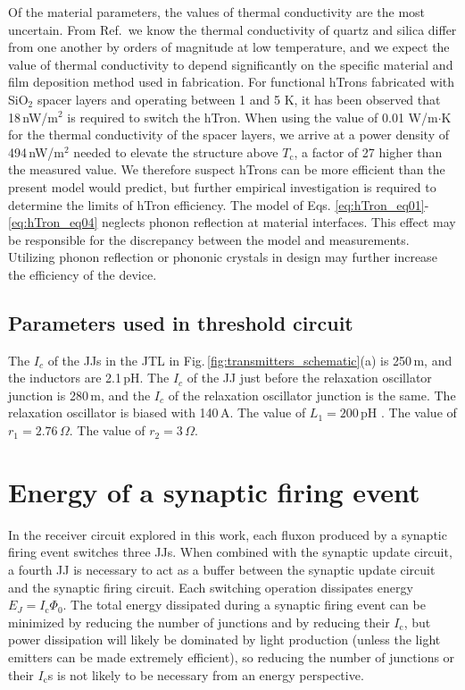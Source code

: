 \documentclass[twocolumn]{article}
\newcommand{\onlinecite}[1]{\hspace{-1 ex} \nocite{#1}\citenum{#1}}
\begin{document}
Of the material parameters, the values of thermal conductivity are the most uncertain. From Ref.\,\onlinecite{zepo1971} we know the thermal conductivity of quartz and silica differ from one another by orders of magnitude at low temperature, and we expect the value of thermal conductivity to depend significantly on the specific material and film deposition method used in fabrication. For functional hTrons fabricated with SiO$_2$ spacer layers and operating between 1 and 5 K, it has been observed \cite{mc2018} that 18\,nW/\textmu m$^2$ is required to switch the hTron. When using the value of 0.01 W/m$\cdot$K for the thermal conductivity of the spacer layers, we arrive at a power density of 494\,nW/\textmu m$^2$ needed to elevate the structure above $T_{\mathrm{c}}$, a factor of 27 higher than the measured value. We therefore suspect hTrons can be more efficient than the present model would predict, but further empirical investigation is required to determine the limits of hTron efficiency. The model of Eqs. \ref{eq:hTron_eq01}-\ref{eq:hTron_eq04} neglects phonon reflection at material interfaces. This effect may be responsible for the discrepancy between the model and measurements. Utilizing phonon reflection or phononic crystals in design may further increase the efficiency of the device.

\subsection{Parameters used in threshold circuit}
The $I_c$ of the JJs in the JTL in Fig.\,\ref{fig:transmitters_schematic}(a) is 250\,\textmu m, and the inductors are 2.1\,pH. The $I_c$ of the JJ just before the relaxation oscillator junction is 280\,\textmu m, and the $I_c$ of the relaxation oscillator junction is the same. The relaxation oscillator is biased with 140\,\textmu A. The value of $L_1 = 200$\,pH . The value of $r_1 = 2.76$\,$\Omega$. The value of $r_2 = 3$\,$\Omega$.

\section{\label{sec:appendix_energy}Energy of a synaptic firing event}
In the receiver circuit explored in this work, each fluxon produced by a synaptic firing event switches three JJs. When combined with the synaptic update circuit, a fourth JJ is necessary to act as a buffer between the synaptic update circuit and the synaptic firing circuit. Each switching operation dissipates energy $E_{J} = I_{\mathrm{c}} \Phi_{0}$. The total energy dissipated during a synaptic firing event can be minimized by reducing the number of junctions and by reducing their $I_{\mathrm{c}}$, but power dissipation will likely be dominated by light production (unless the light emitters can be made extremely efficient), so reducing the number of junctions or their $I_{\mathrm{c}}$s is not likely to be necessary from an energy perspective. 
\end{document}
